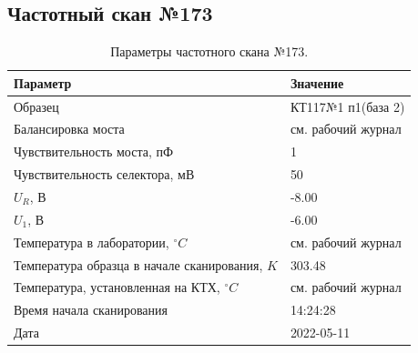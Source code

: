 \subsection{Частотный скан №173}
\begin{table}[!ht]
    \centering
    \caption{Параметры частотного скана №173.}
    \begin{tabular}{|l|l|}
        \hline
        Параметр                                       & Значение                  \\ \hline
        Образец                                        & КТ117№1 п1(база 2)        \\ \hline
        Балансировка моста                             & см. рабочий журнал        \\ \hline
        Чувствительность моста, пФ                     & 1                         \\ \hline
        Чувствительность селектора, мВ                 & 50                        \\ \hline
        $U_R$, В                                       & -8.00                     \\ \hline
        $U_1$, В                                       & -6.00                     \\ \hline
        Температура в лаборатории, $^\circ C$          & см. рабочий журнал        \\ \hline
        Температура образца в начале сканирования, $K$ & 303.48                    \\ \hline
        Температура, установленная на КТХ, $^\circ C$  & см. рабочий журнал        \\ \hline
        Время начала сканирования                      & 14:24:28                  \\ \hline
        Дата                                           & 2022-05-11                \\ \hline
    \end{tabular}
    \label{table:frequency_scan_173}
\end{table}

